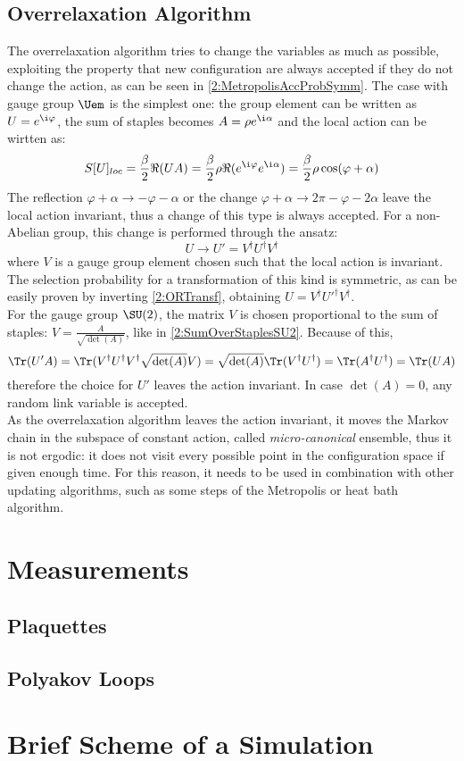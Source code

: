 \subsection{Overrelaxation Algorithm}
The overrelaxation algorithm tries to change the variables as much as possible, exploiting the property that new configuration are always accepted if they do not change the action, as can be seen in \eqref{2:MetropolisAccProbSymm}.
The case with gauge group $\Uem$ is the simplest one: the group element can be written as $U=e^{\i\varphi}$, the sum of staples becomes $A=\rho e^{\i\alpha}$ and the local action can be wirtten as:
\begin{equation}
    S[U]_{loc} = \frac\beta2 \Re(UA) = \frac\beta2 \rho \Re(e^{\i\varphi}e^{\i\alpha}) = \frac\beta2\rho\cos(\varphi+\alpha) \label{2:SlocORU1}  
\end{equation}
The reflection $\varphi+\alpha\to-\varphi-\alpha$ or the change $\varphi+\alpha\to2\pi-\varphi-2\alpha$ leave the local action invariant, thus a change of this type is always accepted.
For a non-Abelian group, this change is performed through the ansatz:
\begin{equation}
    U \to U' = V^\dagger U^\dagger V^\dagger \label{2:ORTransf}
\end{equation}
where $V$ is a gauge group element chosen such that the local action is invariant.
The selection probability for a transformation of this kind is symmetric, as can be easily proven by inverting \eqref{2:ORTransf}, obtaining $U = V^\dagger U'^\dagger V^\dagger$.\\
For the gauge group $\SU(2)$, the matrix $V$ is chosen proportional to the sum of staples: $V=\frac{A}{\sqrt{\det(A)}}$, like in \eqref{2:SumOverStaplesSU2}.
Because of this,
\begin{equation}
    \Tr(U'A) = \Tr(V^\dagger U^\dagger V^\dagger \sqrt{\det(A)} V) = \sqrt{\det(A)} \Tr(V^\dagger U^\dagger) = \Tr(A^\dagger U^\dagger) = \Tr(UA) \label{2:ORTrace}
\end{equation}
therefore the choice for $U'$ leaves the action invariant.
In case $\det(A)=0$, any random link variable is accepted.\\
As the overrelaxation algorithm leaves the action invariant, it moves the Markov chain in the subspace of constant action, called \emph{micro-canonical} ensemble, thus it is not ergodic: it does not visit every possible point in the configuration space if given enough time.
For this reason, it needs to be used in combination with other updating algorithms, such as some steps of the Metropolis or heat bath algorithm.

\section{Measurements}

\subsection{Plaquettes}

\subsection{Polyakov Loops}

\section{Brief Scheme of a Simulation}
